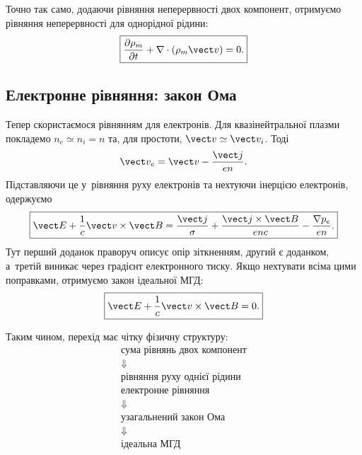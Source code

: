 Точно так само, додаючи рівняння неперервності двох компонент, отримуємо рівняння
неперервності для однорідної рідини:
\begin{equation}\label{eq:one-fluid-continuity-from-two-fluid}
\boxed{
\frac{\partial\rho_m}{\partial t}
+
\nabla\cdot(\rho_m\vect v)=0.
}
\end{equation}



\subsection{Електронне рівняння: закон Ома}



Тепер скористаємося рівнянням для електронів. Для квазінейтральної плазми покладемо
$n_e\simeq n_i=n$ та, для простоти, $\vect v\simeq\vect v_i$. Тоді
\begin{equation*}
\vect v_e=\vect v-\frac{\vect j}{en}.
\end{equation*}
Підставляючи це у~рівняння руху електронів та нехтуючи інерцією електронів, одержуємо
\begin{equation}\label{eq:generalized-ohm-from-two-fluid}
\boxed{
\vect E+\frac1c\vect v\times\vect B
=
\frac{\vect j}{\sigma}
+
\frac{\vect j\times\vect B}{enc}
-
\frac{\nabla p_e}{en}.
}
\end{equation}
Тут перший доданок праворуч описує опір зіткненням, другий є  доданком,
а~третій виникає через градієнт електронного тиску. Якщо нехтувати всіма цими поправками,
отримуємо закон ідеальної МГД:
\begin{equation}\label{eq:ideal-mhd-ohm}
\boxed{
\vect E+\frac1c\vect v\times\vect B=0.
}
\end{equation}

Таким чином, перехід має чітку фізичну структуру:
\begin{equation*}
\boxed{
\begin{array}{c}
\text{сума рівнянь двох компонент}
\\[-1mm]
\Downarrow
\\[-1mm]
\text{рівняння руху однієї рідини}
\\[1mm]
\text{електронне рівняння}
\\[-1mm]
\Downarrow
\\[-1mm]
\text{узагальнений закон Ома}
\\[-1mm]
\Downarrow
\\[-1mm]
\text{ідеальна МГД}
\end{array}}
\end{equation*}

